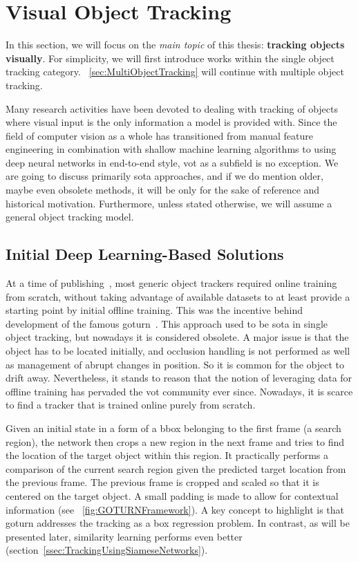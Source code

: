 \section{Visual Object Tracking}
\label{sec:VisualObjectTracking}

In this section, we will focus on the \emph{main topic} of this thesis: \textbf{tracking objects visually}. For simplicity, we will first introduce works within the single object tracking category. \sectionstr{}~\ref{sec:MultiObjectTracking} will continue with multiple object tracking.

Many research activities have been devoted to dealing with tracking of objects where visual input is the only information a model is provided with. Since the field of computer vision as a whole has transitioned from manual feature engineering in combination with shallow machine learning algorithms to using deep neural networks in end-to-end style, \gls{vot} as a subfield is no exception. We are going to discuss primarily \gls{sota} approaches, and if we do mention older, maybe even obsolete methods, it will be only for the sake of reference and historical motivation. Furthermore, unless stated otherwise, we will assume a general object tracking model.

\subsection{Initial Deep Learning-Based Solutions}
\label{ssec:InitialDeepLearningBasedSolutions}

At a time of publishing~\cite{held2016goturn}, most generic object trackers required online training from scratch, without taking advantage of available datasets to at least provide a starting point by initial offline training. This was the incentive behind development of the famous \gls{goturn}~\cite{held2016goturn}. This approach used to be \gls{sota} in single object tracking, but nowadays it is considered obsolete. A major issue is that the object has to be located initially, and occlusion handling is not performed as well as management of abrupt changes in position. So it is common for the object to drift away. Nevertheless, it stands to reason that the notion of leveraging data for offline training has pervaded the \gls{vot} community ever since. Nowadays, it is scarce to find a tracker that is trained online purely from scratch.

Given an initial state in a form of a \gls{bbox} belonging to the first frame (a search region), the network then crops a new region in the next frame and tries to find the location of the target object within this region. It practically performs a comparison of the current search region given the predicted target location from the previous frame. The previous frame is cropped and scaled so that it is centered on the target object. A small padding is made to allow for contextual information (see \figstr{}~\ref{fig:GOTURNFramework}). A key concept to highlight is that \gls{goturn} addresses the tracking as a box regression problem. In contrast, as will be presented later, similarity learning performs even better (section~\ref{ssec:TrackingUsingSiameseNetworks}).

